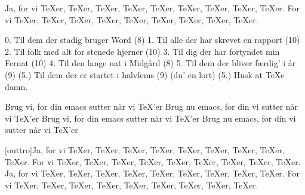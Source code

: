 \documentclass[a4paper,11pt]{article}
\begin{document}
\begin{song}
Ja, for vi TeXer, TeXer, TeXer, TeXer, TeXer, TeXer, TeXer, TeXer, TeXer.
For vi TeXer, TeXer, TeXer, TeXer, TeXer, TeXer, TeXer, TeXer, TeXer.

 0. Til dem der stadig bruger Word (8)
 1. Til alle der har skrevet en rapport (10)
 2. Til folk med alt for stenede hjerner (10)
 3. Til dig der har fortyndet min Fernat (10)
 4. Til den lange nat i Midgård (8)
 5. Til dem der bliver færdig' i år (9)
 (5.) Til dem der er startet i halvfems (9) (du' en lort)
 (5.) Husk at TeXe damn.


Brug vi, for din emacs sutter når vi TeX'er
Brug nu emacs, for din vi sutter når vi TeX'er
Brug vi, for din emacs sutter når vi TeX'er
Brug nu emacs, for din vi sutter når vi TeX'er



[outtro]Ja, for vi TeXer, TeXer, TeXer, TeXer, TeXer, TeXer, TeXer, TeXer, TeXer.
For vi TeXer, TeXer, TeXer, TeXer, TeXer, TeXer, TeXer, TeXer, TeXer.
Ja, for vi TeXer, TeXer, TeXer, TeXer, TeXer, TeXer, TeXer, TeXer, TeXer.
For vi TeXer, TeXer, TeXer, TeXer, TeXer, TeXer, TeXer, TeXer, TeXer.


\end{song}
\end{document}
